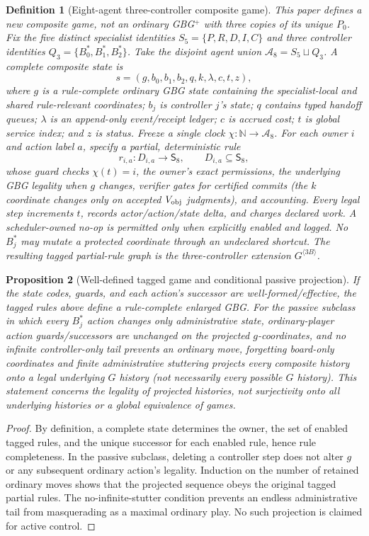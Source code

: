 \documentclass[10pt,letterpaper]{article}
\newtheorem{definition}{Definition}[section]
\newtheorem{proposition}[definition]{Proposition}
\theoremstyle{remark}\newtheorem{remark}[definition]{Remark}
\newcommand{\Ag}{\mathcal{A}}
\newcommand{\N}{\mathbb{N}}
\begin{document}
\begin{definition}[Eight-agent three-controller composite game]
This paper defines a \emph{new composite game}, not an ordinary GBG$^+$ with three copies of its unique $P_0$. Fix the five distinct specialist identities $S_5=\{P,R,D,I,C\}$ and three controller identities $Q_3=\{B_0^*,B_1^*,B_2^*\}$. Take the disjoint agent union $\Ag_8=S_5\sqcup Q_3$. A complete composite state is
\[
s=(g,b_0,b_1,b_2,q,k,\lambda,c,t,z),
\]
where $g$ is a rule-complete ordinary GBG state containing the specialist-local and shared rule-relevant coordinates; $b_j$ is controller $j$'s state; $q$ contains typed handoff queues; $\lambda$ is an append-only event/receipt ledger; $c$ is accrued cost; $t$ is global service index; and $z$ is status. Freeze a single clock $\chi:\N\to\Ag_8$. For each owner $i$ and action label $a$, specify a \emph{partial, deterministic} rule
\[
r_{i,a}:D_{i,a}\longrightarrow\mathsf S_8,\qquad D_{i,a}\subseteq\mathsf S_8,
\]
whose guard checks $\chi(t)=i$, the owner's exact permissions, the underlying GBG legality when $g$ changes, verifier gates for certified commits (the $k$ coordinate changes only on accepted $V_{\rm obj}$ judgments), and accounting. Every legal step increments $t$, records actor/action/state delta, and charges declared work. A scheduler-owned no-op is permitted only when explicitly enabled and logged. No $B_j^*$ may mutate a protected coordinate through an undeclared shortcut. The resulting tagged partial-rule graph is the \emph{three-controller extension} $G^{\langle3B\rangle}$.
\end{definition}

\begin{proposition}[Well-defined tagged game and conditional passive projection]
If the state codes, guards, and each action's successor are well-formed/effective, the tagged rules above define a rule-complete enlarged GBG. For the \emph{passive subclass} in which every $B_j^*$ action changes only administrative state, ordinary-player action guards/successors are unchanged on the projected $g$-coordinates, and no infinite controller-only tail prevents an ordinary move, forgetting board-only coordinates and finite administrative stuttering projects every composite history onto a legal underlying $G$ history (not necessarily every possible $G$ history). This statement concerns the \emph{legality of projected histories}, not surjectivity onto all underlying histories or a global equivalence of games.
\end{proposition}
\begin{proof}
By definition, a complete state determines the owner, the set of enabled tagged rules, and the unique successor for each enabled rule, hence rule completeness. In the passive subclass, deleting a controller step does not alter $g$ or any subsequent ordinary action's legality. Induction on the number of retained ordinary moves shows that the projected sequence obeys the original tagged partial rules. The no-infinite-stutter condition prevents an endless administrative tail from masquerading as a maximal ordinary play. No such projection is claimed for active control.
\end{proof}
\end{document}
